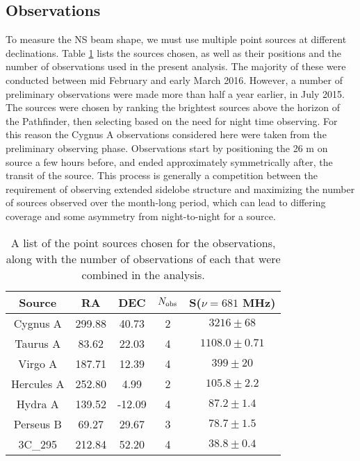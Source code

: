 \subsection{Observations} \label{obssec}

To measure the NS beam shape, we must use multiple point sources at different declinations. Table \ref{tab1} lists the sources chosen, as well as their positions and the number of observations used in the present analysis. The majority of these were conducted between mid February and early March 2016. However, a number of preliminary observations were made more than half a year earlier, in July 2015. The sources were chosen by ranking the brightest sources above the horizon of the Pathfinder, then selecting based on the need for night time observing. For this reason the Cygnus A observations considered here were taken from the preliminary observing phase. Observations start by positioning the 26 m on source a few hours before, and ended approximately symmetrically after, the transit of the source. This process is generally a competition between the requirement of observing extended sidelobe structure and maximizing the number of sources observed over the month-long period, which can lead to differing coverage and some asymmetry from night-to-night for a source.

\begin{table}[ht]
\caption{A list of the point sources chosen for the observations, along with the number of observations of each that were combined in the analysis.} 
\label{tab1}
\begin{center}
\begin{tabular}{| c  | c | c | c | c |  }
\hline
 Source  & RA    &        DEC    &  $N_{\rm obs}$ & S($\nu=681$ MHz) \\ \hline
Cygnus A & 299.88  & 40.73  & 2 & $3216 \pm 68$ \\ \hline
Taurus A & 83.62  & 22.03   & 4  & $1108.0 \pm 0.71$ \\ \hline
Virgo A & 187.71 & 12.39  & 4 & $399 \pm 20$\\ \hline
Hercules A & 252.80   & 4.99  & 2   & $105.8 \pm 2.2$  \\ \hline
Hydra A & 139.52  & -12.09  & 4 & $87.2 \pm 1.4$ \\ \hline
Perseus B  & 69.27  & 29.67  &  3  & $78.7 \pm 1.5$ \\ \hline
3C\_295 & 212.84  & 52.20 & 4   & $38.8 \pm 0.4$\\ \hline
\end{tabular}
\end{center}
\end{table}


